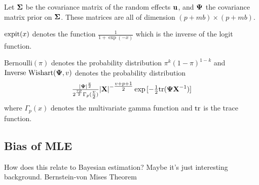 \documentclass{amsart}[12pt]
\begin{document}
Let ${\boldsymbol \Sigma}$ be the covariance matrix of the random effects ${\bf u}$,
and 
${\boldsymbol \Psi}$ the covariance matrix prior on ${\boldsymbol \Sigma}$.
These matrices are all of dimension $(p + m b) \times (p + m b)$.


$\text{expit} (x)$ denotes the function $\tfrac{1}{1 + \exp(-x)}$ which is the inverse of the logit
function.

$\text{Bernoulli}(\pi)$ denotes the probability distribution $\pi^k (1 - \pi)^{1-k}$ and
$\text{Inverse Wishart}({\boldsymbol \Psi}, v)$ denotes the probability distribution
$$\tfrac{|{\boldsymbol \Psi}|^\frac{v}{2}}{2^{\frac{vp}{2}} \Gamma_p{(\tfrac{v}{2})}} |{\bf X}|^{-\tfrac{v + p + 1}{2}}
\exp{[- \tfrac{1}{2} \text{tr}{({\boldsymbol\Psi}{\bf X}^{-1})}]}$$ where $\Gamma_p{(x)}$ denotes the multivariate gamma function and $\text{tr}$
is the trace function.

\subsection{Bias of MLE}

How does this relate to Bayesian estimation? Maybe it's just interesting background.
Bernstein-von Mises Theorem


% 

\end{document}
